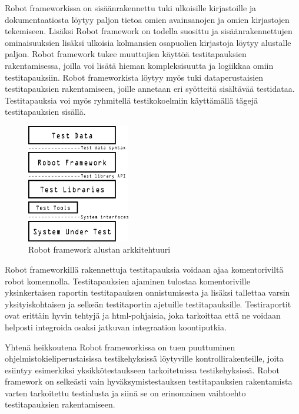     Robot frameworkissa on sisäänrakennettu tuki ulkoisille kirjastoille ja dokumentaatiosta löytyy paljon tietoa omien avainsanojen ja omien kirjastojen tekemiseen.
    Lisäksi Robot framework on todella suosittu ja sisäänrakennettujen ominaisuuksien lisäksi ulkoisia kolmansien osapuolien kirjastoja löytyy alustalle paljon.
    Robot framework tukee muuttujien käyttöä testitapauksien rakentamisessa, joilla voi lisätä hieman kompleksisuutta ja logiikkaa omiin testitapauksiin.
    Robot frameworkista löytyy myös tuki dataperustaisien testitapauksien rakentamiseen, joille annetaan eri syötteitä sisältävää testidataa.
    Testitapauksia voi myös ryhmitellä testikokoelmiin käyttämällä tägejä testitapauksien sisällä.

    \begin{figure}[H]
      \centering
      \includegraphics[width=0.4\textwidth]{assets/robot-arkkitehtuuri.png}
      \caption{Robot framework alustan arkkitehtuuri}
      \label{fig:robot-architecture}
    \end{figure}

    Robot frameworkillä rakennettuja testitapauksia voidaan ajaa komentoriviltä robot komennolla.
    Testitapauksien ajaminen tulostaa komentoriville yksinkertaisen raportin testitapauksen onnistumisesta ja lisäksi tallettaa varsin yksityiskohtaisen ja selkeän testitaportin ajetuille testitapauksille.
    Testiraportit ovat erittäin hyvin tehtyjä ja html-pohjaisia, joka tarkoittaa että ne voidaan helposti integroida osaksi jatkuvan integraation koontiputkia.

    Yhtenä heikkoutena Robot frameworkissa on tuen puuttuminen ohjelmistokieliperustaisissa testikehyksissä löytyville kontrollirakenteille, joita esiintyy esimerkiksi yksikkötestaukseen tarkoitetuissa testikehyksissä.
    Robot framework on selkeästi vain hyväksymistestauksen testitapauksien rakentamista varten tarkoitettu testialusta ja siinä se on erinomainen vaihtoehto testitapauksien rakentamiseen.

